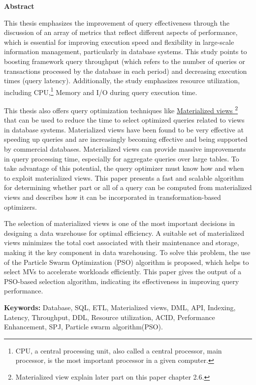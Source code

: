 
\begin{center}
    \fancyhead[]{}\Large\textbf{Abstract}
    \cfoot{\thepage} %
\end{center}

\normalsize
This thesis emphasizes the improvement of query effectiveness through the discussion of an array of metrics that reflect different aspects of performance, which is essential for improving execution speed and flexibility in large-scale information management, particularly in database systems. This study points to boosting framework query throughput (which refers to the number of queries or transactions processed by the database in each period) and decreasing execution times (query latency). Additionally, the study emphasizes resource utilization,  including CPU,\footnote{CPU, a central processing unit, also called a central processor, main processor, is the most important processor in a given computer.} Memory and I/O during query execution time.\vspace{.4cm}

This thesis also offers query optimization techniques like \hyperref[term:materialized_views]{Materialized views \footnote{Materialized view explain later part on this paper chapter 2.6.}} that can be used to reduce the time to select optimized queries related to views in database systems. Materialized views have been found to be very effective at speeding up queries and are increasingly becoming effective and being supported by commercial databases. Materialized views can provide massive improvements in query processing time, especially for aggregate queries over large tables. To take advantage of this potential, the query optimizer must know how and when to exploit materialized views. This paper presents a fast and scalable algorithm for determining whether part or all of a query can be computed from materialized views and describes how it can be incorporated in transformation-based optimizers.\vspace{.4cm}

The selection of materialized views is one of the most important decisions in designing a data warehouse for optimal efficiency. A suitable set of materialized views minimizes the total cost associated with their maintenance and storage, making it the key component in data warehousing. To solve this problem, the use of the Particle Swarm Optimization (PSO) algorithm is proposed, which helps to select MVs to accelerate workloads efficiently. This paper gives the output of a PSO-based selection algorithm, indicating its effectiveness in improving query performance.\vspace{.4cm}



\noindent \textbf{Keywords:} Database, SQL, ETL, Materialized views, DML, API, Indexing, Latency, Throughput, DDL, Resource utilization, ACID, Performance Enhancement, SPJ, Particle swarm algorithm(PSO).

 

